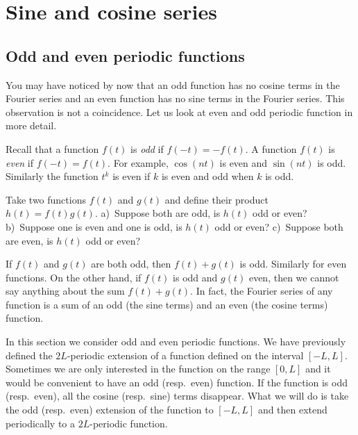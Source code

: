 
\sectionnewpage
\section{Sine and cosine series}
\label{sec:scs}


\subsection{Odd and even periodic functions}

You may have noticed by now that an odd function has no cosine terms in the 
Fourier series and an even function has no sine terms in the Fourier series.
This observation is not a coincidence.  Let us look at even and odd periodic
function in more detail.

Recall that a function $f(t)$ is \emph{odd} if $f(-t) =
-f(t)$.  A function $f(t)$ is \emph{even} if
$f(-t) = f(t)$.  For example, $\cos (n t)$ is even and $\sin (n t)$ is odd.
Similarly the function $t^k$ is even if $k$ is even and odd when $k$ is odd.

\begin{exercise}
Take two functions $f(t)$ and $g(t)$ and define their product $h(t) =
f(t)g(t)$.  a)~Suppose both are odd, is
$h(t)$ odd or even?  b)~Suppose one is even and one is odd,
is $h(t)$ odd or even?  c)~Suppose both are even, is $h(t)$
odd or even?
\end{exercise}

If $f(t)$ and $g(t)$ are both odd, then $f(t)+g(t)$ is odd.  Similarly for
even functions.  On the other hand,
if $f(t)$ is odd and $g(t)$ even, then we cannot say anything about
the sum
$f(t) + g(t)$.  In fact, the Fourier series of any function is a sum of
an odd (the sine terms) and an even (the cosine terms) function.

In this section we consider odd and even periodic
functions.  We have previously defined the $2L$-periodic extension
of a function defined on the interval $[-L,L]$.  Sometimes we are only
interested in the function on the range $[0,L]$ and it would be convenient
to have an odd (resp.\ even) function.  If the function is odd (resp.\ even),
all the cosine (resp.\ sine) terms disappear.
What we will do is
take the
odd (resp.\ even) extension of the function to $[-L,L]$ and then 
extend periodically to a $2L$-periodic function.

